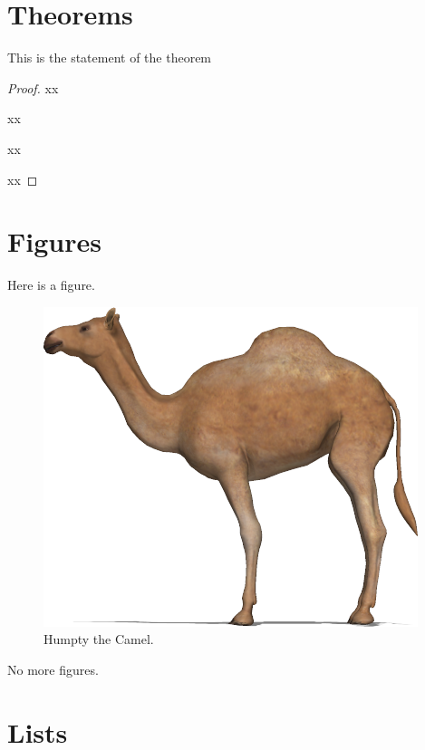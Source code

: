 \documentclass{camel}
\begin{document}
\chapter{Theorems}\label{ch:theorems}

\begin{theorem}
This is the statement of the theorem
\end{theorem}

\begin{proof}
xx

xx

xx

xx
\end{proof}

%
%

\chapter{Figures}\label{ch:figures}

Here is a figure.
\begin{figure}[htb]
\centering
\includegraphics[scale=0.25]{figures/humpty.png}
\caption{Humpty the Camel.}
\label{humpty-the-camel}
\end{figure}
No more figures.

\chapter{Lists}\label{ch:lists}
\end{document}

